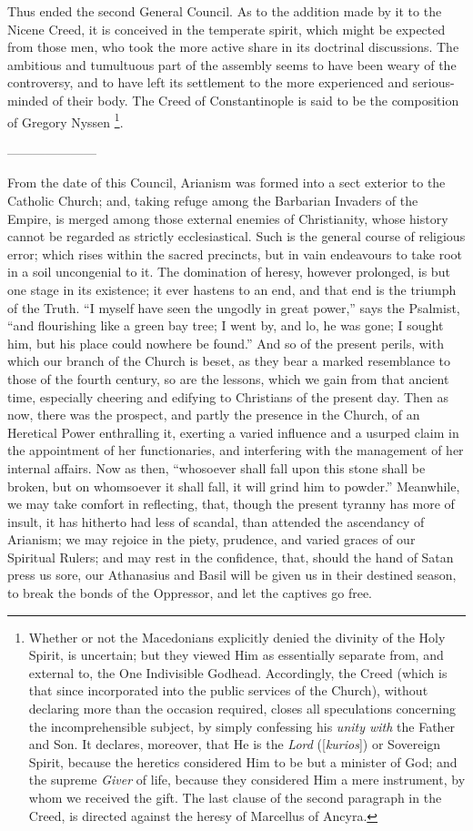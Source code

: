 Thus ended the second General Council. As to the addition made by
it to the Nicene Creed, it is conceived in the temperate spirit, which
might be expected from those men, who took the more active share in
its doctrinal discussions. The ambitious and tumultuous part of the
assembly seems to have been weary of the controversy, and to have left
its settlement to the more experienced and serious-minded of their
body. The Creed of Constantinople is said to be the composition of
Gregory Nyssen \footnote{Whether or not the Macedonians explicitly
denied the divinity of the Holy Spirit, is uncertain; but they viewed
Him as essentially separate from, and external to, the One Indivisible
Godhead. Accordingly, the Creed (which is that since incorporated into
the public services of the Church), without declaring more than the
occasion required, closes all speculations concerning the
incomprehensible subject, by simply confessing his \emph{unity with}
the Father and Son. It declares, moreover, that He is the \emph{Lord}
([\emph{kurios}]) or Sovereign Spirit, because the heretics considered
Him to be but a minister of God; and the supreme \emph{Giver} of life,
because they considered Him a mere instrument, by whom we received the
gift. The last clause of the second paragraph in the Creed, is
directed against the heresy of Marcellus of Ancyra.}.

———————

From the date of this Council, Arianism was formed into a sect
exterior to the Catholic Church; and, taking refuge among the
Barbarian Invaders of the Empire, is merged among those external
enemies of Christianity, whose history cannot be regarded as strictly
ecclesiastical. Such is the general course of religious error; which
rises within the sacred precincts, but in vain endeavours to take root
in a soil uncongenial to it. The domination of heresy, however
prolonged, is but one stage in its existence; it ever hastens to an
end, and that end is the triumph of the Truth. ``I myself have
seen the ungodly in great power,'' says the Psalmist, ``and
flourishing like a green bay tree; I went by, and lo, he was gone; I
sought him, but his place could nowhere be found.'' And so of the
present perils, with which our branch of the Church is beset, as they
bear a marked resemblance to those of the fourth century, so are the
lessons, which we gain from that ancient time, especially cheering and
edifying to Christians of the present day. Then as now, there was the
prospect, and partly the presence in the Church, of an Heretical Power
enthralling it, exerting a varied influence and a usurped claim in the
appointment of her functionaries, and interfering with the management
of her internal affairs. Now as then, ``whosoever shall fall upon
this stone shall be broken, but on whomsoever it shall fall, it
will grind him to powder.'' Meanwhile, we may take comfort in
reflecting, that, though the present tyranny has more of insult, it
has hitherto had less of scandal, than attended the ascendancy of
Arianism; we may rejoice in the piety, prudence, and varied graces of
our Spiritual Rulers; and may rest in the confidence, that, should the
hand of Satan press us sore, our Athanasius and Basil will be given us
in their destined season, to break the bonds of the Oppressor, and let
the captives go free.


